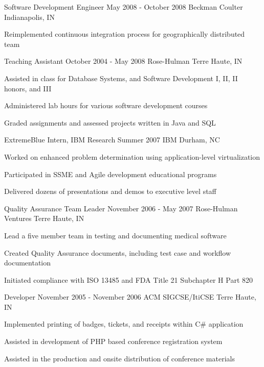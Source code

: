 {\begin{cventries}
  \cventry
  {Software Development Engineer}
  {May 2008 - October 2008}
  {Beckman Coulter}
  {Indianapolis, IN}
  {
    \begin{cvitems}
      \item Reimplemented continuous integration process for geographically distributed team
    \end{cvitems}
    \cvtags{
      \tagCSharp
      \tagCI
      \tagTDD
    }
  }

  \cventry
  {Teaching Assistant}
  {October 2004 - May 2008}
  {Rose-Hulman}
  {Terre Haute, IN}
  {
    \begin{cvitems}
      \item Assisted in class for Database Systems, and Software Development I, II, II honors, and III
      \item Administered lab hours for various software development courses
      \item Graded assignments and assessed projects written in Java and SQL
    \end{cvitems}
    \cvtags{
      \tagJava
      \tagMSSQL
      \tagMySQL
      \tagTeaching
    }
  }

  \cventry
  {ExtremeBlue Intern, IBM Research}
  {Summer 2007}
  {IBM}
  {Durham, NC}
  {
    \begin{cvitems}
      \item Worked on enhanced problem determination using application-level virtualization
      \item Participated in SSME and Agile development educational programs
      \item Delivered dozens of presentations and demos to executive level staff
    \end{cvitems}
    \cvtags{
      \tagCplusplus
      \tagPublicSpeaking
    }
  }

  \cventry
  {Quality Assurance Team Leader}
  {November 2006 - May 2007}
  {Rose-Hulman Ventures}
  {Terre Haute, IN}
  {
    \begin{cvitems}
      \item Lead a five member team in testing and documenting medical software
      \item Created Quality Assurance documents, including test case and workflow documentation
      \item Initiated compliance with ISO 13485 and FDA Title 21 Subchapter H Part 820
    \end{cvitems}
    \cvtags{\tagManualQATesting}
  }

  \cventry
  {Developer}
  {November 2005 - November 2006}
  {ACM SIGCSE/ItiCSE}
  {Terre Haute, IN}
  {
    \begin{cvitems}
      \item Implemented printing of badges, tickets, and receipts within C\# application
      \item Assisted in development of PHP based conference registration system
      \item Assisted in the production and onsite distribution of conference materials
    \end{cvitems}
    \cvtags{
      \tagCSharp
      \tagPHP
      \tagMSSQL
      \tagCustomerService
    }
  }


\end{cventries}}
